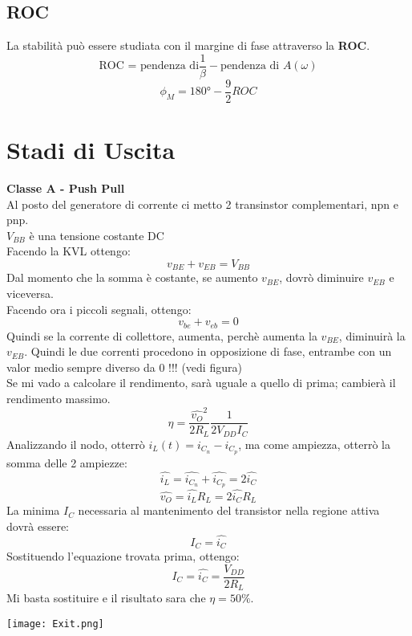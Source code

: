\documentclass{article}
\begin{document}
\subsection{ROC}
La stabilità può essere studiata con il margine di fase attraverso la \textbf{ROC}.
\begin{equation}
    \mbox {ROC = pendenza di} \frac{1}{\beta} - \mbox{pendenza di }A(\omega) 
\end{equation}
\begin{equation}
    \phi_{M}=180°-\frac{9}{2}ROC
\end{equation}

\newpage
\section{Stadi di Uscita}

\textbf{Classe A - Push Pull}\\
Al posto del generatore di corrente ci metto 2 transinstor complementari, npn e pnp.\\
$V_{BB}$ è una tensione costante DC \\
Facendo la KVL ottengo:\\
\begin{equation}
    v_{BE}+v_{EB}=V_{BB}
\end{equation}
Dal momento che la somma è costante, se aumento $v_{BE}$, dovrò diminuire $v_{EB}$ e viceversa.\\
Facendo ora i piccoli segnali, ottengo: \\
\begin{equation}
    v_{be}+v_{eb}=0
\end{equation}
Quindi se la corrente di collettore, aumenta, perchè aumenta la $v_{BE}$, diminuirà la $v_{EB}$. Quindi le due correnti procedono in opposizione di fase, entrambe con un valor medio sempre diverso da 0 !!! (vedi figura)\\
Se mi vado a calcolare il rendimento, sarà uguale a quello di prima; cambierà il rendimento massimo.\\
\begin{equation}
    \eta=\frac{\hat{v_{O}}^2}{2R_{L}}\frac{1}{2V_{DD}I_{C}}
\end{equation}
Analizzando il nodo, otterrò $i_{L}(t)=i_{C_{n}}-i_{C_{p}}$, ma come ampiezza, otterrò la somma delle 2 ampiezze: 
\begin{equation}
    \hat{i_{L}}=\hat{i_{C_{n}}}+\hat{i_{C_{p}}}=2\hat{i_{C}}
\end{equation}
\begin{equation}
    \hat{v_{O}}=\hat{i_{L}}R_{L}=2\hat{i_{C}}R_{L}
\end{equation}
La minima $I_{C}$ necessaria al mantenimento del transistor nella regione attiva dovrà essere:
\begin{equation}
    I_{C}=\hat{i_{C}}
\end{equation}
Sostituendo l'equazione trovata prima, ottengo:
\begin{equation}
    I_{C}=\hat{i_{C}}=\frac{V_{DD}}{2R_{L}}
\end{equation}
Mi basta sostituire e il risultato sara che $ \eta=50\% $.
\begin{center}
    \texttt{[image: Exit.png]}
\end{center}
\end{document}

